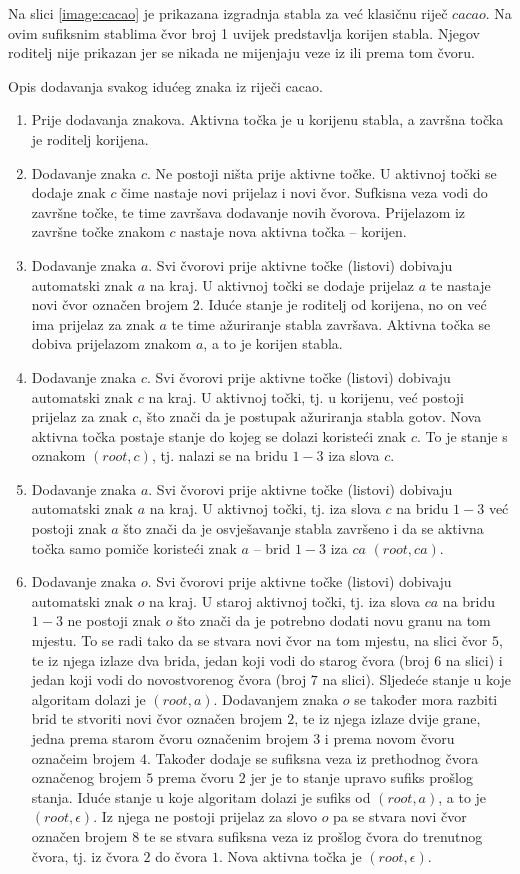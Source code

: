 \documentclass[times, utf8, seminar, numeric]{fer}
\begin{document}
Na slici \ref{image:cacao} je prikazana izgradnja stabla za već klasičnu riječ $cacao$. Na ovim sufiksnim stablima čvor broj 1 uvijek predstavlja korijen stabla. Njegov roditelj nije prikazan jer se nikada ne mijenjaju veze iz ili prema tom čvoru.

Opis dodavanja svakog idućeg znaka iz riječi cacao.
\begin{enumerate}
	\item Prije dodavanja znakova. Aktivna točka je u korijenu stabla, a završna točka je roditelj korijena.
	\item Dodavanje znaka $c$. Ne postoji ništa prije aktivne točke. U aktivnoj točki se dodaje znak $c$ čime nastaje novi prijelaz i novi čvor. Sufkisna veza vodi do završne točke, te time završava dodavanje novih čvorova. Prijelazom iz završne točke znakom $c$ nastaje nova aktivna točka -- korijen.
	\item Dodavanje znaka $a$. Svi čvorovi prije aktivne točke (listovi) dobivaju automatski znak $a$ na kraj. U aktivnoj točki se dodaje prijelaz $a$ te nastaje novi čvor označen brojem 2. Iduće stanje je roditelj od korijena, no on već ima prijelaz za znak $a$ te time ažuriranje stabla završava. Aktivna točka se dobiva prijelazom znakom $a$, a to je korijen stabla.
	\item Dodavanje znaka $c$. Svi čvorovi prije aktivne točke (listovi) dobivaju automatski znak $c$ na kraj. U aktivnoj točki, tj. u korijenu, već postoji prijelaz za znak $c$, što znači da je postupak ažuriranja stabla gotov. Nova aktivna točka postaje stanje do kojeg se dolazi koristeći znak $c$. To je stanje s oznakom $(root, c)$, tj. nalazi se na bridu $1-3$ iza slova $c$.
	\item Dodavanje znaka $a$. Svi čvorovi prije aktivne točke (listovi) dobivaju automatski znak $a$ na kraj. U aktivnoj točki, tj. iza slova $c$ na bridu $1-3$ već postoji znak $a$ što znači da je osvješavanje stabla završeno i da se aktivna točka samo pomiče koristeći znak $a$ -- brid $1-3$ iza $ca$ $(root, ca)$.
	\item Dodavanje znaka $o$. Svi čvorovi prije aktivne točke (listovi) dobivaju automatski znak $o$ na kraj. U staroj aktivnoj točki, tj. iza slova $ca$ na bridu $1-3$ ne postoji znak $o$ što znači da je potrebno dodati novu granu na tom mjestu. To se radi tako da se stvara novi čvor na tom mjestu, na slici čvor $5$, te iz njega izlaze dva brida, jedan koji vodi do starog čvora (broj $6$ na slici) i jedan koji vodi do novostvorenog čvora (broj $7$ na slici). Sljedeće stanje u koje algoritam dolazi je $(root, a)$. Dodavanjem znaka $o$ se također mora razbiti brid te stvoriti novi čvor označen brojem $2$, te iz njega izlaze dvije grane, jedna prema starom čvoru označenim brojem $3$ i prema novom čvoru označeim brojem $4$. Također dodaje se sufiksna veza iz prethodnog čvora označenog brojem $5$ prema čvoru $2$ jer je to stanje upravo sufiks prošlog stanja. Iduće stanje u koje algoritam dolazi je sufiks od $(root, a)$, a to je $(root, \epsilon)$. Iz njega ne postoji prijelaz za slovo $o$ pa se stvara novi čvor označen brojem $8$ te se stvara sufiksna veza iz prošlog čvora do trenutnog čvora, tj. iz čvora $2$ do čvora $1$. Nova aktivna točka je $(root, \epsilon)$.
\end{enumerate}
\end{document}
